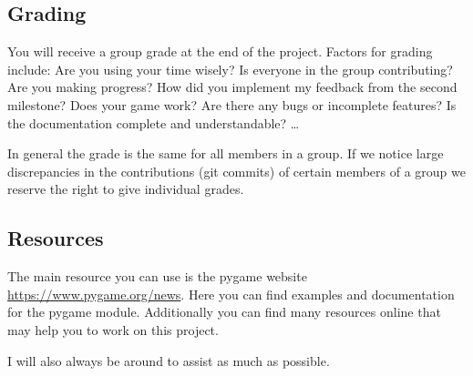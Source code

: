 \documentclass[11pt,a4paper]{report}
\begin{document}
\subsection{Grading}
You will receive a group grade at the end of the project. Factors for grading include: Are you using your time wisely? Is everyone in the group contributing? Are you making progress? How did you implement my feedback from the second milestone? Does your game work? Are there any bugs or incomplete features? Is the documentation complete and understandable? \ldots

In general the grade is the same for all members in a group. If we notice large discrepancies in the contributions (git commits) of certain members of a group we reserve the right to give individual grades.

\subsection{Resources}
The main resource you can use is the pygame website \url{https://www.pygame.org/news}. Here you can find examples and documentation for the pygame module. Additionally you can find many resources online that may help you to work on this project. 

I will also always be around to assist as much as possible.
\end{document}
